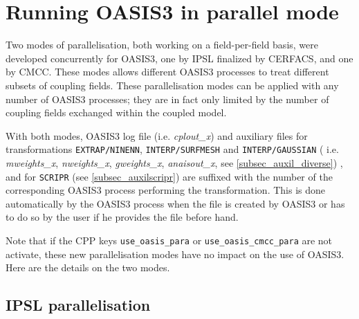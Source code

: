 %
% 
%

\section{Running OASIS3 in parallel mode}
\label{sec_pseudopara_mode}

Two modes of parallelisation, both working on a field-per-field basis, 
were developed concurrently for OASIS3, one by IPSL finalized by CERFACS, and 
one by CMCC. These modes allows different OASIS3 processes to treat
different subsets of coupling fields.
These parallelisation modes can be applied with
any number of OASIS3 processes; they are in fact only limited by the number
of coupling fields exchanged within the coupled model.

With both modes, OASIS3 log file (i.e. {\it cplout\_x}) and auxiliary 
files for transformations {\tt EXTRAP/NINENN}, {\tt INTERP/SURFMESH} and 
{\tt INTERP/GAUSSIAN} ( i.e. {\it mweights\_x}, {\it nweights\_x}, {\it gweights\_x},
{\it anaisout\_x}, see \ref{subsec_auxil_diverse}) , and for {\tt SCRIPR} (see
\ref{subsec_auxilscripr}) are suffixed with the number of the
corresponding OASIS3 process performing the transformation. This is done automatically
by the OASIS3 process when the file is created by OASIS3 or has to do so by the user
if he provides the file before hand.

Note that if the CPP keys {\tt use\_oasis\_para} or {\tt use\_oasis\_cmcc\_para}
are not activate, these new parallelisation modes have no impact on the use of
OASIS3. Here are the details on the two modes.

\subsection{IPSL parallelisation}
\label{sec_ipslpara_mode}


